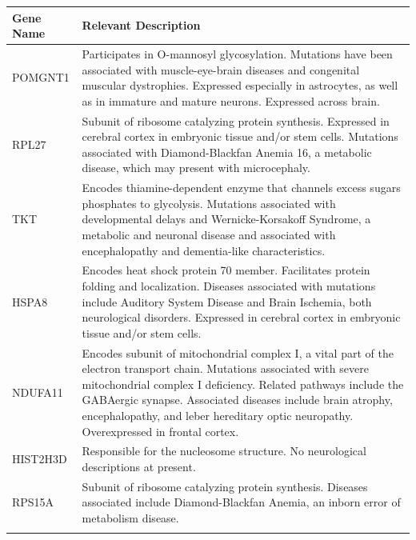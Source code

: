 \documentclass[10pt, oneside]{article}
\begin{document}
\begin{table}[!]
    \centering
{}
\begin{tabular}{p{2.5cm}p{15.5cm}}
 \textbf{Gene Name} & \textbf{Relevant Description} \\
 \hline
 POMGNT1 & Participates in O-mannosyl glycosylation. Mutations have been associated with muscle-eye-brain diseases and congenital muscular dystrophies. Expressed especially in astrocytes, as well as in immature and mature neurons. Expressed across brain. \\
 \hline
 RPL27 & Subunit of ribosome catalyzing protein synthesis. Expressed in cerebral cortex in embryonic tissue and/or stem cells. Mutations associated with Diamond-Blackfan Anemia 16, a metabolic disease, which may present with microcephaly. \\
 \hline
 TKT & Encodes thiamine-dependent enzyme that channels excess sugars phosphates to glycolysis. Mutations associated with developmental delays and Wernicke-Korsakoff Syndrome, a metabolic and neuronal disease and associated with encephalopathy and dementia-like characteristics. \\
 \hline
 HSPA8 & Encodes heat shock protein 70 member. Facilitates protein folding and localization. Diseases associated with mutations include Auditory System Disease and Brain Ischemia, both neurological disorders. Expressed in cerebral cortex in embryonic tissue and/or stem cells. \\
 \hline
 NDUFA11 & Encodes subunit of mitochondrial complex I, a vital part of the electron transport chain. Mutations associated with severe mitochondrial complex I deficiency. Related pathways include the GABAergic synapse. Associated diseases include brain atrophy, encephalopathy, and leber hereditary optic neuropathy. Overexpressed in frontal cortex. \\
 \hline
 HIST2H3D & Responsible for the nucleosome structure. No neurological descriptions at present. \\
 \hline
 RPS15A & Subunit of ribosome catalyzing protein synthesis. Diseases associated include Diamond-Blackfan Anemia, an inborn error of metabolism disease. \\
 \label{tab:targets}
\end{tabular}
\end{table}
\end{document}
